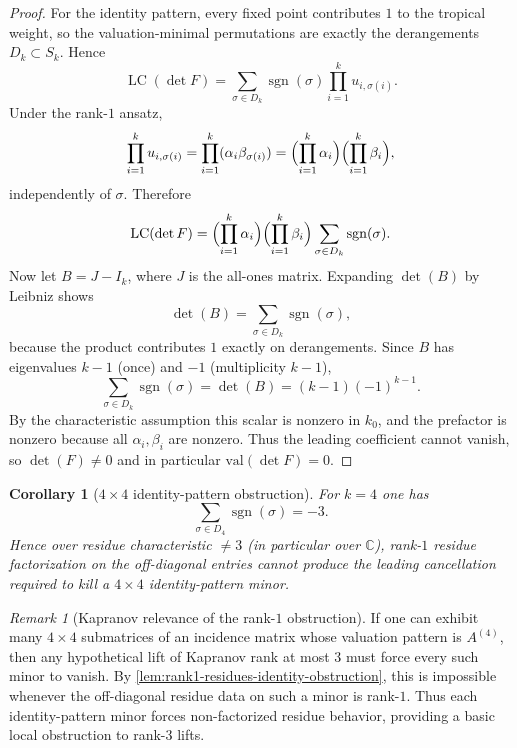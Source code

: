 \documentclass[11pt]{amsart}
\numberwithin{equation}{section}
\theoremstyle{plain}
\newtheorem{corollary}[theorem]{Corollary}
\theoremstyle{definition}
\theoremstyle{remark}
\newtheorem{remark}[theorem]{Remark}
\newcommand{\val}{\mathrm{val}}
\begin{document}
\begin{proof}
For the identity pattern, every fixed point contributes $1$ to the tropical weight, so the valuation-minimal permutations are exactly the derangements $D_k\subset S_k$. Hence
\[
\operatorname{LC}(\det F)=\sum_{\sigma\in D_k}\operatorname{sgn}(\sigma)\prod_{i=1}^k u_{i,\sigma(i)}.
\]
Under the rank-$1$ ansatz,
\[
\prod_{i=1}^k u_{i,\sigma(i)}
=\prod_{i=1}^k (\alpha_i\beta_{\sigma(i)})
=\Bigl(\prod_{i=1}^k \alpha_i\Bigr)\Bigl(\prod_{i=1}^k \beta_i\Bigr),
\]
independently of $\sigma$. Therefore
\[
\operatorname{LC}(\det F)=\Bigl(\prod_{i=1}^k \alpha_i\Bigr)\Bigl(\prod_{i=1}^k \beta_i\Bigr)
\sum_{\sigma\in D_k}\operatorname{sgn}(\sigma).
\]
Now let $B=J-I_k$, where $J$ is the all-ones matrix. Expanding $\det(B)$ by Leibniz shows
\[
\det(B)=\sum_{\sigma\in D_k}\operatorname{sgn}(\sigma),
\]
because the product contributes $1$ exactly on derangements. Since $B$ has eigenvalues $k-1$ (once) and $-1$ (multiplicity $k-1$),
\[
\sum_{\sigma\in D_k}\operatorname{sgn}(\sigma)=\det(B)=(k-1)(-1)^{k-1}.
\]
By the characteristic assumption this scalar is nonzero in $k_0$, and the prefactor is nonzero because all $\alpha_i,\beta_i$ are nonzero. Thus the leading coefficient cannot vanish, so $\det(F)\neq 0$ and in particular $\val(\det F)=0$.
\end{proof}

\begin{corollary}[$4\times4$ identity-pattern obstruction]
\label{cor:identity4-rank1-obstruction}
For $k=4$ one has
\[
\sum_{\sigma\in D_4}\operatorname{sgn}(\sigma)=-3.
\]
Hence over residue characteristic $\neq 3$ (in particular over $\mathbb C$), rank-$1$ residue factorization on the off-diagonal entries cannot produce the leading cancellation required to kill a $4\times4$ identity-pattern minor.
\end{corollary}

\begin{remark}[Kapranov relevance of the rank-$1$ obstruction]
\label{rem:identity-pattern-kapranov-relevance}
If one can exhibit many $4\times4$ submatrices of an incidence matrix whose valuation pattern is $A^{(4)}$, then any hypothetical lift of Kapranov rank at most $3$ must force every such minor to vanish. By \cref{lem:rank1-residues-identity-obstruction}, this is impossible whenever the off-diagonal residue data on such a minor is rank-$1$. Thus each identity-pattern minor forces non-factorized residue behavior, providing a basic local obstruction to rank-$3$ lifts.
\end{remark}
\end{document}
